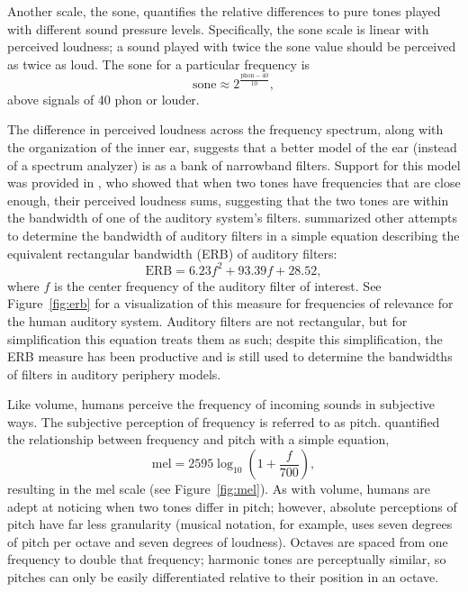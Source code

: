 
Another scale, the sone,
quantifies the relative differences
to pure tones played with
different sound pressure levels.
Specifically, the sone scale
is linear with perceived loudness;
a sound played with twice the sone value
should be perceived as twice as loud.
The sone for a particular frequency is
\begin{equation}
  \text{sone} \approx 2^{\frac{\text{phon} - 40}{10}},
\end{equation}
above signals of 40 phon or louder.

The difference in perceived loudness
across the frequency spectrum,
along with the organization
of the inner ear,
suggests that a better model
of the ear (instead of a spectrum analyzer)
is as a bank of narrowband filters.
Support for this model was provided
in \citet{zwicker1957},
who showed that when two tones
have frequencies that are close enough,
their perceived loudness sums,
suggesting that the two tones
are within the bandwidth of one of the
auditory system's filters.
\citet{moore1983}
summarized other attempts to
determine the bandwidth
of auditory filters
in a simple equation
describing the equivalent
rectangular bandwidth (ERB)
of auditory filters:
\begin{equation}
  \text{ERB} = 6.23 f^2 + 93.39 f + 28.52,
\end{equation}
where $f$ is the center frequency
of the auditory filter of interest.
See Figure~\ref{fig:erb} for a visualization of
this measure for frequencies of relevance
for the human auditory system.
Auditory filters are not rectangular,
but for simplification this equation
treats them as such;
despite this simplification,
the ERB measure has been productive and is still used
to determine the bandwidths
of filters in auditory periphery models.


Like volume,
humans perceive
the frequency of incoming sounds
in subjective ways.
The subjective perception of frequency
is referred to as pitch.
\citet{stevens1937} quantified
the relationship between
frequency and pitch
with a simple equation,
\begin{equation}
  \text{mel} = 2595 \log_{10} \left(1 + \frac{f}{700}\right),
\end{equation}
resulting in the mel scale
(see Figure~\ref{fig:mel}).
As with volume, humans are adept at
noticing when two tones differ in pitch;
however, absolute perceptions of pitch
have far less granularity
(musical notation, for example,
uses seven degrees of pitch per octave
and seven degrees of loudness).
Octaves are spaced from one frequency
to double that frequency;
harmonic tones are perceptually similar,
so pitches can only
be easily differentiated
relative to their position in an octave.

